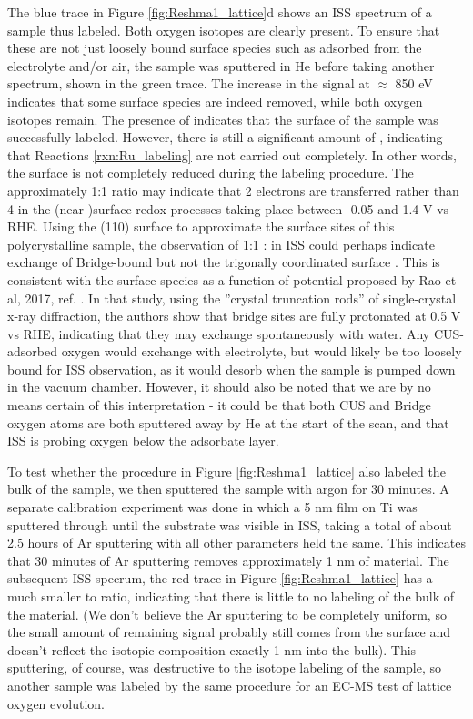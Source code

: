 The blue trace in Figure \ref{fig:Reshma1_lattice}d shows an ISS spectrum of a sample thus labeled. Both oxygen isotopes are clearly present. To ensure that these are not just loosely bound surface species such as adsorbed  from the electrolyte and/or air, the sample was sputtered in He before taking another spectrum, shown in the green trace. The increase in the  signal at $\approx$ 850 eV indicates that some surface species are indeed removed, while both oxygen isotopes remain. The presence of  indicates that the surface of the sample was successfully labeled. However, there is still a significant amount of , indicating that Reactions \ref{rxn:Ru_labeling} are not carried out completely. In other words, the surface is not completely reduced during the labeling procedure. The approximately 1:1 ratio may indicate that 2 electrons are transferred rather than 4 in the (near-)surface redox processes taking place between -0.05 and 1.4 V vs RHE. Using the (110) surface to approximate the surface sites of this polycrystalline sample, the observation of 1:1 : in ISS could perhaps indicate exchange of Bridge-bound  but not the trigonally coordinated surface . This is consistent with the surface species as a function of potential proposed by Rao et al, 2017, ref. . In that study, using the ''crystal truncation rods'' of single-crystal x-ray diffraction, the authors show that bridge sites are fully protonated at 0.5 V vs RHE, indicating that they may exchange spontaneously with water. Any CUS-adsorbed oxygen would exchange with electrolyte, but would likely be too loosely bound for ISS observation, as it would desorb when the sample is pumped down in the vacuum chamber\cite{Over2000}. However, it should also be noted that we are by no means certain of this interpretation - it could be that both CUS and Bridge oxygen atoms are both sputtered away by He at the start of the scan, and that ISS is probing oxygen below the adsorbate layer.

To test whether the procedure in Figure \ref{fig:Reshma1_lattice} also labeled the bulk of the sample, we then sputtered the sample with argon for 30 minutes. A separate calibration experiment was done in which a 5 nm  film on Ti was sputtered through until the substrate was visible in ISS, taking a total of about 2.5 hours of Ar sputtering with all other parameters held the same. This indicates that 30 minutes of Ar sputtering removes approximately 1 nm of material. The subsequent ISS specrum, the red trace in Figure \ref{fig:Reshma1_lattice} has a much smaller  to  ratio, indicating that there is little to no labeling of the bulk of the material. (We don't believe the Ar sputtering to be completely uniform, so the small amount of remaining  signal probably still comes from the surface and doesn't reflect the isotopic composition exactly 1 nm into the bulk). This sputtering, of course, was destructive to the isotope labeling of the sample, so another sample was labeled by the same procedure for an EC-MS test of lattice oxygen evolution.

